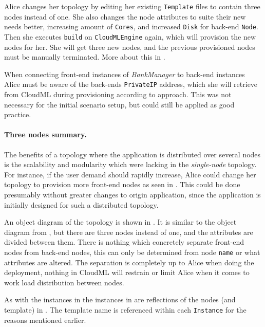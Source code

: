 Alice changes her topology by editing her existing \texttt{Template} files 
to contain three nodes instead of one. 
She also changes the node attributes to suite their new needs better,
\ie increasing amount of \texttt{Cores}, and increased \texttt{Disk} for back-end \texttt{Node}.
Then she executes \texttt{build} on \texttt{CloudMLEngine} again,
which will provision the new nodes for her.
She will get three new nodes, and the previous provisioned nodes must be manually terminated.
More about this in .

When connecting front-end instances of \emph{BankManager} to back-end instances Alice must 
be aware of the back-ends \texttt{PrivateIP} address, which she will retrieve from CloudML
during provisioning according to  approach.
This was not necessary for the initial scenario setup, but could still be applied
as good practice.

\paragraph{Three nodes summary.}


The benefits of a topology where the application is distributed over several nodes 
is the scalability and modularity which were lacking in the \emph{single-node} topology.
For instance, if the user demand should rapidly increase, Alice could change her topology to
provision more front-end nodes as seen in .
This could be done presumably without greater changes to origin application,
since the application is initially designed for such a distributed topology.

An object diagram of the topology is shown in .
It is similar to the object diagram from ,
but there are three nodes instead of one, and the attributes are divided between them.
There is nothing which concretely separate front-end nodes from back-end nodes,
this can only be determined from node \texttt{name} or what attributes are altered.
The separation is completely up to Alice when doing the deployment,
\ie nothing in CloudML will restrain or limit Alice 
when it comes to work load distribution between nodes.

As with the instances in  the instances in 
are reflections of the nodes (and template) in .
The template name is referenced within each \texttt{Instance} 
for the reasons mentioned earlier.

